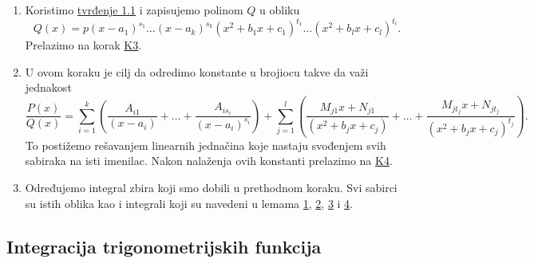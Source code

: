 \documentclass{article}
\begin{document}
\begin{algbox}
\begin{enumerate}[label=\text{K\arabic*:}]
        \item\label{algoritam_1_K2}
              Koristimo \hyperref[tvrđenje_1.1]{tvrđenje 1.1} i zapisujemo polinom $Q$ u obliku
              $$Q\left(x\right) = p\left(x - a_1\right)^{s_1}\dotsc\left(x-a_k\right)^{s_k}\left(x^2 + b_1x + c_1\right)^{t_1}\dotsc\left(x^2 + b_lx + c_l\right)^{t_l}.$$
              Prelazimo na korak \hyperref[algoritam_1_K3]{K3}.
        \item\label{algoritam_1_K3}
              U ovom koraku je cilj da odredimo konstante u brojiocu takve da važi jednakost
              $$\frac{P\left(x\right)}{Q\left(x\right)}=\sum_{i = 1}^k\left(\frac{A_{i1}}{\left(x-a_i\right)}+\dotsc+\frac{A_{is_i}}{\left(x-a_i\right)^{s_i}}\right) + \sum_{j = 1}^l\left( \frac{M_{j1}x + N_{j1}}{\left(x^2+b_jx+c_j\right)}+\dotsc+\frac{M_{jt_j}x + N_{jt_j}}{\left(x^2 + b_jx + c_j\right)^{t_j}}\right).$$
              To postižemo rešavanjem linearnih jednačina koje
              nastaju svođenjem svih sabiraka na isti imenilac.
              Nakon nalaženja ovih konstanti prelazimo na \hyperref[algoritam_1_K4]{K4}.
        \item\label{algoritam_1_K4}
              Određujemo integral zbira koji smo dobili u prethodnom koraku.
              Svi sabirci su istih oblika kao i integrali koji su navedeni u lemama
              \hyperref[lema_1.1]{1}, \hyperref[lema_1.2]{2}, \hyperref[lema_1.3]{3} i \hyperref[lema_1.4]{4}.

    \end{enumerate}
\end{algbox}

\subsection{Integracija trigonometrijskih funkcija}
\end{document}
